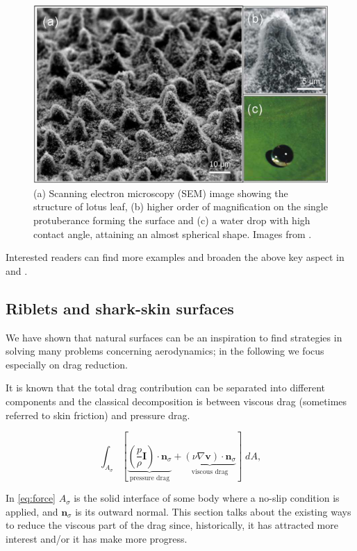 \begin{figure}[h]
	\centering
	\includegraphics[width=0.6\linewidth]{chapter_1/lotus}
	\caption{(a) Scanning electron microscopy (SEM) image showing the structure of lotus leaf, (b) higher order of magnification on the single protuberance forming the surface and (c) a water drop with high contact angle, attaining an almost spherical shape. Images from \citet{stratakis2009laser}.}
	\label{fig:lotus}
\end{figure}

Interested readers can find more examples and broaden the above key aspect in \citet{bhushan2016biomimetics} and \citet{tropea2012nature}.

\subsection{Riblets and shark-skin surfaces}

We have shown that natural surfaces can be an inspiration to find strategies in solving many problems concerning aerodynamics; in the following we focus especially on drag reduction.

It is known that the total drag contribution can be separated into different components and the classical decomposition is between viscous drag (sometimes referred to skin friction) and pressure drag.

\begin{equation}
 \int_{A_{\sigma}}  [ \underbrace{\left( \frac{p}{\rho} \mathbf{I} \right) \cdot  \mathbf{n}_{\sigma} }_\text{pressure drag}  +  \underbrace{ \left( \nu \nabla \mathbf{v} \right) \cdot  \mathbf{n}_{\sigma}}_\text{viscous drag} ] \; dA,
 \label{eq:force}
\end{equation}

In \eqref{eq:force} $A_{\sigma}$ is the solid interface of some body where a no-slip condition is applied, and $ \mathbf{n}_{\sigma}$ is its outward normal.
This section talks about the existing ways to reduce the viscous part of the drag since, historically, it has attracted more interest and/or it has make more progress.

